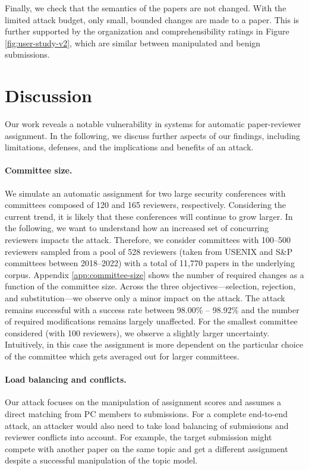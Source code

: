 \documentclass[letterpaper,twocolumn,10pt]{article}
\begin{document}
Finally, we check that the semantics of the papers are not changed. With the limited attack budget, only small, bounded changes are made to a paper. 
This is further supported by the organization and comprehensibility ratings in Figure \ref{fig:user-study-v2}, which are similar between manipulated and benign submissions. \section{Discussion}
\label{sec:discussion}

Our work reveals a notable vulnerability in systems for automatic paper-reviewer assignment. 
In the following, we discuss further aspects of our findings, including limitations, defenses, and the implications and benefits of an attack.

\paragraph{Committee size.}
We simulate an automatic assignment for two large security conferences with committees composed of 120 and 165 reviewers, respectively. Considering the current trend, it is likely that these conferences will continue to grow larger. In the following, we want to understand how an increased set of concurring reviewers impacts the attack.
Therefore, we consider committees with 100--500 reviewers sampled from a pool of 528 reviewers (taken from USENIX and S\&P committees between 2018--2022) with a total of 11,770 papers in the underlying corpus.
Appendix \ref{app:committee-size} shows the number of required changes as a function of the committee size. Across the three objectives---selection, rejection, and substitution---we observe only a minor impact on the attack. The attack remains successful with a success rate between 98.00\% -- 98.92\% and the number of required modifications remains largely unaffected. For the smallest committee considered (with 100 reviewers), we observe a slightly larger uncertainty. Intuitively, in this case the assignment is more dependent on the particular choice of the committee which gets averaged out for larger committees.

\paragraph{Load balancing and conflicts.}
Our attack focuses on the manipulation of assignment scores and assumes a direct matching from PC members to submissions. For a complete end-to-end attack, an attacker would also need to take load balancing of submissions and reviewer conflicts into account. For example, the target submission might compete with another paper on the same topic and get a different assignment despite a successful manipulation of the topic model.
\end{document}
